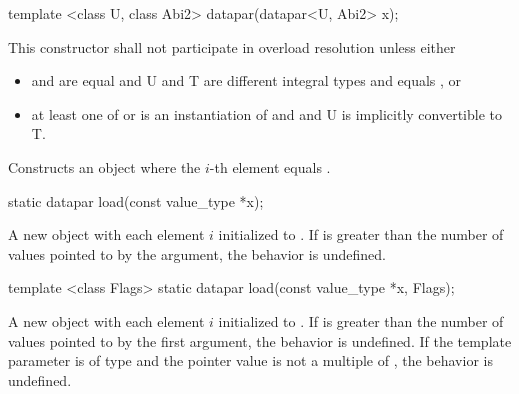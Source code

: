 
\begin{itemdecl}
template <class U, class Abi2> datapar(datapar<U, Abi2> x);
\end{itemdecl}
\begin{itemdescr}
  \pnum\remarks This constructor shall not participate in overload resolution unless either
  \begin{itemize}
    \item {} and  are equal and
      \type U and \type T are different integral types and
       equals , or
    \item at least one of  or  is an instantiation of \fixedsizescoped and  and \type U is implicitly convertible to \type T.
  \end{itemize}
  \pnum\effects Constructs an object where the $i$-th element equals  \foralli.
\end{itemdescr}

\begin{itemdecl}
static datapar load(const value_type *x);
\end{itemdecl}
\begin{itemdescr}
  \pnum \returns A new \datapar object with each element $i$ initialized to  \foralli.
  \pnum \remarks If \datapar{} is greater than the number of values pointed to by the argument, the behavior is undefined.
\end{itemdescr}

\begin{itemdecl}
template <class Flags> static datapar load(const value_type *x, Flags);
\end{itemdecl}
\begin{itemdescr}
  \pnum\returns A new \datapar object with each element $i$ initialized to  \foralli.
  \pnum\remarks If \datapar{} is greater than the number of values pointed to by the first argument, the behavior is undefined.
  \pnum\remarks If the template parameter is of type  and the pointer value is not a multiple of , the behavior is undefined.
\end{itemdescr}


